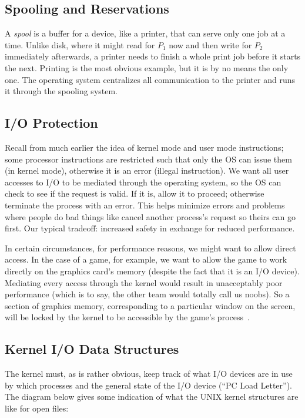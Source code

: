 \subsection*{Spooling and Reservations}
A \textit{spool} is a buffer for a device, like a printer, that can serve only one job at a time. Unlike disk, where it might read for $P_{1}$ now and then write for $P_{2}$ immediately afterwards, a printer needs to finish a whole print job before it starts the next. Printing is the most obvious example, but it is by no means the only one. The operating system centralizes all communication to the printer and runs it through the spooling system. 

\subsection*{I/O Protection}
Recall from much earlier the idea of kernel mode and user mode instructions; some processor instructions are restricted such that only the OS can issue them (in kernel mode), otherwise it is an error (illegal instruction). We want all user accesses to I/O to be mediated through the operating system, so the OS can check to see if the request is valid. If it is, allow it to proceed; otherwise terminate the process with an error. This helps minimize errors and problems where people do bad things like cancel another process's request so theirs can go first. Our typical tradeoff: increased safety in exchange for reduced performance.

In certain circumstances, for performance reasons, we might want to allow direct access. In the case of a game, for example, we want to allow the game to work directly on the graphics card's memory (despite the fact that it is an I/O device). Mediating every access through the kernel would result in unacceptably poor performance (which is to say, the other team would totally call us noobs). So a section of graphics memory, corresponding to a particular window on the screen, will be locked by the kernel to be accessible by the game's process~\cite{osc}.

\subsection*{Kernel I/O Data Structures}
The kernel must, as is rather obvious, keep track of what I/O devices are in use by which processes and the general state of the I/O device (``PC Load Letter''). The diagram below gives some indication of what the UNIX kernel structures are like for open files:

